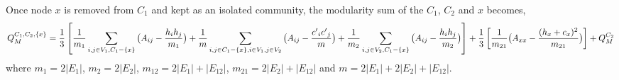 
Once node $x$ is removed from $C_1$ and kept as an isolated community, the modularity sum of the $C_1$, $C_2$ and ${x}$ becomes,
\vspace{-0.18in}
\begin{dmath*}\label{final3}
Q_M^{C_1,C_2,\{x\}}= \frac{1}{3}\left[
 \frac{1}{m_1} \sum_{i,j \in V_1 ,C_1 - \{x\}} \big(A_{ij} - \penalty0 \frac{h_i h_j}{m_1}\big) +\\
 {\frac{1}{m}  \sum_{i,j \in  C_1 - \{x\}, i \in V_1, j \in V_2} \big(A_{ij} - \frac{ {c'}_i {c'}_j}{m}\big) +
 \frac{1}{m_2}} \penalty0 \sum_{i,j \in V_2,C_1 - \{x\}} \big(A_{ij} - \frac{h_i h_j}{m_2}\big) \right] +  
 \frac{1}{3}\left[ \frac{1}{m_{21}} \penalty0 \big(A_{xx} - \frac{(h_x+c_x)^2}{m_{21}}\big)\right] + Q_M^{C_2}
\end{dmath*}
\vspace{-0.05in}
where $m_1=2\left \vert E_1 \right \vert$, $m_2=2\left \vert E_2 \right \vert$,
$m_{12} = 2\left \vert E_1 \right \vert + \left \vert E_{12} \right \vert$, $m_{21} = 2\left \vert E_2 \right \vert + \left \vert E_{12} \right \vert$ and
$m=2\left \vert E_1 \right \vert + 2\left \vert E_2 \right \vert + \left \vert E_{12} \right \vert$.

